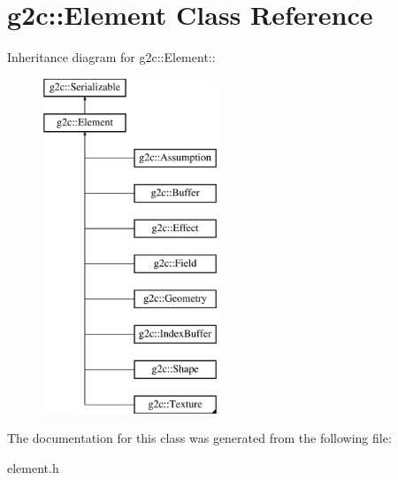 \hypertarget{classg2c_1_1_element}{
\section{g2c::Element Class Reference}
\label{classg2c_1_1_element}
}
Inheritance diagram for g2c::Element::\begin{figure}[H]
\begin{center}
\leavevmode
\includegraphics[height=10cm]{classg2c_1_1_element}
\end{center}
\end{figure}


The documentation for this class was generated from the following file:\begin{DoxyCompactItemize}
\item 
element.h\end{DoxyCompactItemize}
